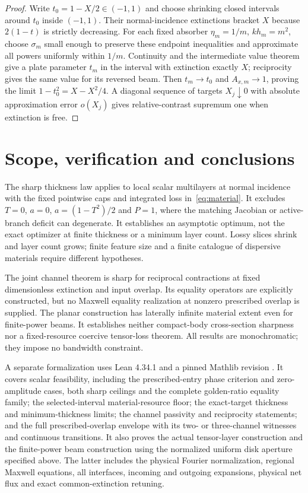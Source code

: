 \documentclass[11pt,a4paper]{article}
\theoremstyle{remark}
\begin{document}
\begin{proof}
Write $t_0=1-X/2\in(-1,1)$ and choose shrinking closed intervals around $t_0$ inside $(-1,1)$. Their normal-incidence extinctions bracket $X$ because $2(1-t)$ is strictly decreasing. For each fixed absorber $\eta_m=1/m$, $kh_m=m^2$, choose $\sigma_m$ small enough to preserve these endpoint inequalities and approximate all powers uniformly within $1/m$. Continuity and the intermediate value theorem give a plate parameter $t_m$ in the interval with extinction exactly $X$; reciprocity gives the same value for its reversed beam. Then $t_m\to t_0$ and $A_{x,m}\to1$, proving the limit $1-t_0^2=X-X^2/4$. A diagonal sequence of targets $X_j\downarrow0$ with absolute approximation error $o(X_j)$ gives relative-contrast supremum one when extinction is free.
\end{proof}

\section{Scope, verification and conclusions}\label{sec:scope}
The sharp thickness law applies to local scalar multilayers at normal incidence with the fixed pointwise caps and integrated loss in~\eqref{eq:material}. It excludes $T=0$, $a=0$, $a=(1-T^2)/2$ and $P=1$, where the matching Jacobian or active-branch deficit can degenerate. It establishes an asymptotic optimum, not the exact optimizer at finite thickness or a minimum layer count. Lossy slices shrink and layer count grows; finite feature size and a finite catalogue of dispersive materials require different hypotheses.

The joint channel theorem is sharp for reciprocal contractions at fixed dimensionless extinction and input overlap. Its equality operators are explicitly constructed, but no Maxwell equality realization at nonzero prescribed overlap is supplied. The planar construction has laterally infinite material extent even for finite-power beams. It establishes neither compact-body cross-section sharpness nor a fixed-resource coercive tensor-loss theorem. All results are monochromatic; they impose no bandwidth constraint.

A separate formalization uses Lean 4.34.1 \citep{deMouraUllrich2021} and a pinned Mathlib revision \citep{mathlib2020}. It covers scalar feasibility, including the prescribed-entry phase criterion and zero-amplitude cases, both sharp ceilings and the complete golden-ratio equality family; the selected-interval material-resource floor; the exact-target thickness and minimum-thickness limits; the channel passivity and reciprocity statements; and the full prescribed-overlap envelope with its two- or three-channel witnesses and continuous transitions. It also proves the actual tensor-layer construction and the finite-power beam construction using the normalized uniform disk aperture specified above. The latter includes the physical Fourier normalization, regional Maxwell equations, all interfaces, incoming and outgoing expansions, physical net flux and exact common-extinction retuning.
\end{document}
